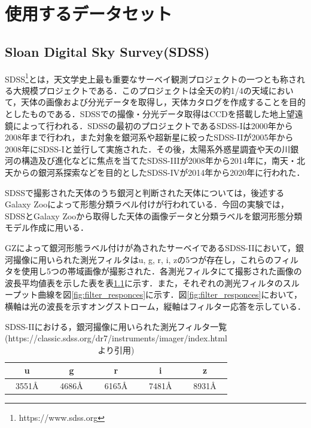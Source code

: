 \documentclass[a4j, 11pt]{jreport}
\begin{document}
\newpage
\chapter{使用するデータセット}
\section{Sloan Digital Sky Survey(SDSS)}

SDSS\footnote{https://www.sdss.org}とは，天文学史上最も重要なサーベイ観測プロジェクトの一つとも称される大規模プロジェクトである．このプロジェクトは全天の約1/4の天域において，天体の画像および分光データを取得し，天体カタログを作成することを目的としたものである．SDSSでの撮像・分光データ取得はCCDを搭載した地上望遠鏡によって行われる．SDSSの最初のプロジェクトであるSDSS-I\cite{York2000}は2000年から2008年まで行われ，また対象を銀河系や超新星に絞ったSDSS-II\cite{York2000}が2005年から2008年にSDSS-Iと並行して実施された．その後，太陽系外惑星調査や天の川銀河の構造及び進化などに焦点を当てたSDSS-III\cite{Eisenstein2011}が2008年から2014年に，南天・北天からの銀河系探索などを目的としたSDSS-IV\cite{Blanton2017}が2014年から2020年に行われた．

SDSSで撮影された天体のうち銀河と判断された天体については，後述するGalaxy Zooによって形態分類ラベル付けが行われている．今回の実験では，SDSSとGalaxy Zooから取得した天体の画像データと分類ラベルを銀河形態分類モデル作成に用いる．

GZによって銀河形態ラベル付けが為されたサーベイであるSDSS-IIにおいて，銀河撮像に用いられた測光フィルタはu, g, r, i, zの5つが存在し，これらのフィルタを使用し5つの帯域画像が撮影された．各測光フィルタにて撮影された画像の波長平均値表を示した表を表\ref{fig:dr7_filters}に示す．また，それぞれの測光フィルタのスループット曲線を図\ref{fig:filter_responces}に示す．図\ref{fig:filter_responces}において，横軸は光の波長を示すオングストローム，縦軸はフィルター応答を示している．

\begin{table}[htbp]
  \centering
	\caption{SDSS-IIにおける，銀河撮像に用いられた測光フィルタ一覧\\(https://classic.sdss.org/dr7/instruments/imager/index.html より引用)}
  \begin{tabular}{|c|c|c|c|c|}
		\hline
    u & g & r & i & z \\ \hline
    3551Å & 4686Å & 6165Å & 7481Å & 8931Å \\ \hline
  \end{tabular}
  \label{fig:dr7_filters}
\end{table}
\end{document}
